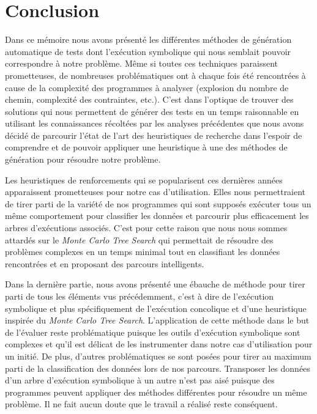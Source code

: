 \chapter*{Conclusion}


Dans ce mémoire nous avons présenté les différentes méthodes de génération automatique de tests dont l'exécution symbolique qui nous semblait pouvoir correspondre à notre problème. Même si toutes ces techniques paraissent prometteuses, de nombreuses problématiques ont à chaque fois été rencontrées à cause de la complexité des programmes à analyser (explosion du nombre de chemin, complexité des contraintes, etc.). C'est dans l'optique de trouver des solutions qui nous permettent de générer des tests en un temps raisonnable en utilisant les connaissances récoltées par les analyses précédentes que nous avons décidé de parcourir l'état de l'art des heuristiques de recherche dans l'espoir de comprendre et de pouvoir appliquer une heuristique à une des méthodes de génération pour résoudre notre problème.

Les heuristiques de renforcements qui se popularisent ces dernières années apparaissent prometteuses pour notre cas d'utilisation. Elles nous permettraient de tirer parti de la variété de nos programmes qui sont supposés exécuter tous un même comportement pour classifier les données et parcourir plus efficacement les arbres d'exécutions associés. C'est pour cette raison que nous nous sommes attardés sur le \textit{Monte Carlo Tree Search} qui permettait de résoudre des problèmes complexes en un temps minimal tout en classifiant les données rencontrées et en proposant des parcours intelligents.

Dans la dernière partie, nous avons présenté une ébauche de méthode pour tirer parti de tous les éléments vus précédemment, c'est à dire de l'exécution symbolique et plus spécifiquement de l'exécution concolique et d'une heuristique inspirée du \textit{Monte Carlo Tree Search}. L'application de cette méthode dans le but de l'évaluer reste problématique puisque les outils d'exécution symbolique sont complexes et qu'il est délicat de les instrumenter dans notre cas d'utilisation pour un initié. De plus, d'autres problématiques se sont posées pour tirer au maximum parti de la classification des données lors de nos parcours. Transposer les données d'un arbre d'exécution symbolique à un autre n'est pas aisé puisque des programmes peuvent appliquer des méthodes différentes pour résoudre un même problème.
Il ne fait aucun doute que le travail a réalisé reste conséquent.